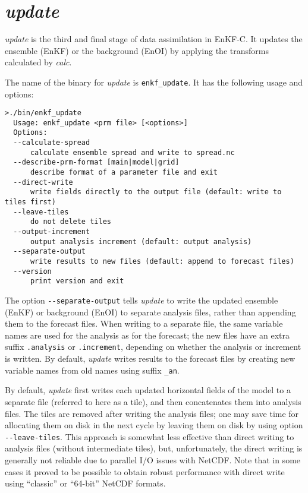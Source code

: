 \documentclass[11pt]{report}
\begin{document}
\section{\emph{update}}

\emph{update} is the third and final stage of data assimilation in EnKF-C.
It updates the ensemble (EnKF) or the background (EnOI) by applying the transforms calculated by \emph{calc}.

The name of the binary for \emph{update} is \verb|enkf_update|.
It has the following usage and options:
\begin{Verbatim}[frame=single,fontsize=\footnotesize]
>./bin/enkf_update
  Usage: enkf_update <prm file> [<options>]
  Options:
  --calculate-spread
      calculate ensemble spread and write to spread.nc
  --describe-prm-format [main|model|grid]
      describe format of a parameter file and exit
  --direct-write
      write fields directly to the output file (default: write to tiles first)
  --leave-tiles
      do not delete tiles
  --output-increment
      output analysis increment (default: output analysis)
  --separate-output
      write results to new files (default: append to forecast files)
  --version
      print version and exit
\end{Verbatim}

The option \verb|--separate-output| tells \emph{update} to write the updated ensemble (EnKF) or background (EnOI) to separate analysis files, rather than appending them to the forecast files.
When writing to a separate file, the same variable names are used for the analysis as for the forecast; the new files have an extra suffix \verb|.analysis| or \verb|.increment|, depending on whether the analysis or increment is written.
By default, \emph{update} writes results to the forecast files by creating new variable names from old names using suffix \verb|_an|.

By default, \emph{update} first writes each updated horizontal fields of the model to a separate file (referred to here as a tile), and then concatenates them into analysis files.
The tiles are removed after writing the analysis files; one may save time for allocating them on disk in the next cycle by leaving them on disk by using option \verb|--leave-tiles|.
This approach is somewhat less effective than direct writing to analysis files (without intermediate tiles), but, unfortunately, the direct writing is generally not reliable due to parallel I/O issues with NetCDF.
Note that in some cases it proved to be possible to obtain robust performance with direct write using ``classic'' or ``64-bit'' NetCDF formats.
\end{document}
